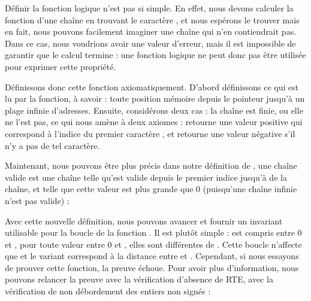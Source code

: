 


Définir la fonction logique  n'est pas si simple. En effet,
nous devons calculer la fonction d'une chaîne en trouvant le caractère
, et nous espérons le trouver mais en fait,
nous pouvons facilement imaginer une chaîne qui n'en contiendrait pas. Dans
ce cas, nous voudrions avoir une valeur d'erreur, mais il est impossible de
garantir que le calcul termine : une fonction logique ne peut donc pas être
utilisée pour exprimer cette propriété.



Définissons donc cette fonction axiomatiquement. D'abord définissons ce qui
est lu par la fonction, à savoir : toute position mémoire depuis le pointeur
jusqu'à un plage infinie d'adresses. Ensuite, considérons deux cas : la chaîne
est finie, ou elle ne l'est pas, ce qui nous amène à deux axiomes :
 retourne une valeur positive qui correspond à l'indice
du premier caractère , et retourne une valeur
négative s'il n'y a pas de tel caractère.






Maintenant, nous pouvons être plus précis dans notre définition de
, une chaîne valide est une
chaîne telle qu'est valide depuis le premier indice jusqu'à 
de la chaîne, et telle que cette valeur est plus grande que 0 (puisqu'une
chaîne infinie n'est pas valide) :




Avec cette nouvelle définition, nous pouvons avancer et fournir un invariant
utilisable pour la boucle de la fonction . Il est plutôt
simple :  est compris entre 0 et , pour
toute valeur entre 0 et , elles sont différentes de
. Cette boucle n'affecte que 
et le variant correspond à la distance entre  et
. Cependant, si nous essayons de prouver cette fonction,
la preuve échoue. Pour avoir plus d'information, nous pouvons relancer la
preuve avec la vérification d'absence de RTE, avec la vérification de non
débordement des entiers non signés :



